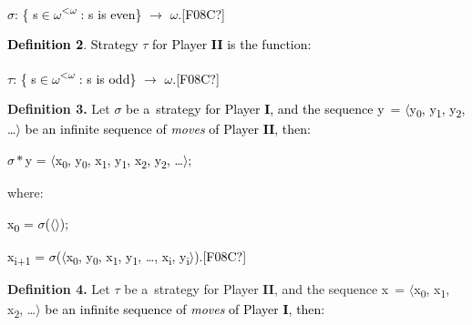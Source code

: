\textcolor{black}{${\sigma}$: \{ s${\in}{\omega}$}\textcolor{black}{\textsuperscript{{\textless}${\omega}$}}\textcolor{black}{ : {\textbar}s{\textbar} is even\} ${\rightarrow}$ ${\omega}$.[F08C?]}

\textbf{\textcolor{black}{Definition 2}}\textcolor{black}{. Strategy }${\tau}$\textcolor{black}{ for Player }\textbf{\textcolor{black}{II}} \textcolor{black}{is the function:}

\textcolor{black}{${\tau}$: \{ s${\in}{\omega}$}\textcolor{black}{\textsuperscript{{\textless}${\omega}$}}\textcolor{black}{ : {\textbar}s{\textbar} is odd\} ${\rightarrow}$ ${\omega}$.[F08C?]}

\textbf{Definition 3.} Let\textcolor{black}{ ${\sigma}$ be a~strategy for Player} \textbf{\textcolor{black}{I}}\textcolor{black}{, and the sequence y~= ${\langle}$y}\textcolor{black}{\textsubscript{0}}\textcolor{black}{, y}\textcolor{black}{\textsubscript{1}}\textcolor{black}{, y}\textcolor{black}{\textsubscript{2}}\textcolor{black}{, …${\rangle}$ be an infinite sequence of }\textit{\textcolor{black}{moves}}\textcolor{black}{ of Player }\textbf{\textcolor{black}{II}}\textcolor{black}{, then: }

\textcolor{black}{${\sigma}*$y = ${\langle}$x}\textcolor{black}{\textsubscript{0}}\textcolor{black}{, y}\textcolor{black}{\textsubscript{0}}\textcolor{black}{, x}\textcolor{black}{\textsubscript{1}}\textcolor{black}{, y}\textcolor{black}{\textsubscript{1}}\textcolor{black}{, x}\textcolor{black}{\textsubscript{2}}\textcolor{black}{, y}\textcolor{black}{\textsubscript{2}}\textcolor{black}{, …${\rangle}$;}


where:

\textcolor{black}{x}\textcolor{black}{\textsubscript{0}}\textcolor{black}{ = ${\sigma}$(${\langle}{\rangle}$);}

\textcolor{black}{x}\textcolor{black}{\textsubscript{i+1 }}\textcolor{black}{= ${\sigma}$(${\langle}$x}\textcolor{black}{\textsubscript{0}}\textcolor{black}{, y}\textcolor{black}{\textsubscript{0}}\textcolor{black}{, x}\textcolor{black}{\textsubscript{1}}\textcolor{black}{, y}\textcolor{black}{\textsubscript{1}}\textcolor{black}{, …, x}\textcolor{black}{\textsubscript{i}}\textcolor{black}{, y}\textcolor{black}{\textsubscript{i}}\textcolor{black}{${\rangle}$).[F08C?]}

\textbf{Definition 4.} Let ${\tau}$ be a~strategy for Player \textbf{II}, and the sequence x~= ${\langle}$x\textsubscript{0}, x\textsubscript{1}, x\textsubscript{2}, …${\rangle}$ \textcolor{black}{be an infinite sequence of} \textit{\textcolor{black}{moves}}\textcolor{black}{ of Player }\textbf{\textcolor{black}{I}}\textcolor{black}{, then:}

